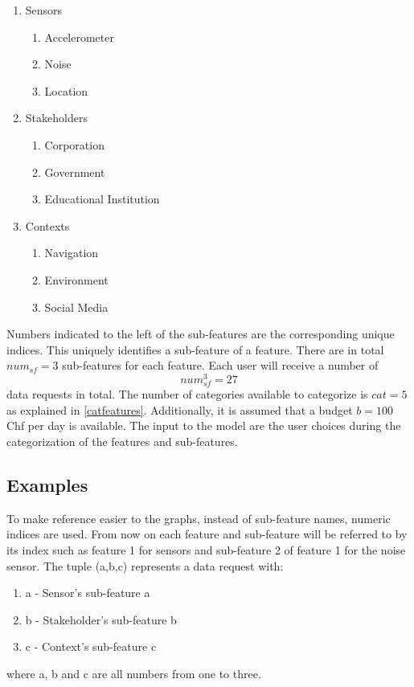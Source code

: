 \begin{enumerate}
    \item Sensors
    \begin{enumerate}
    \item Accelerometer 
    \item Noise 
    \item Location 
   \end{enumerate}
    \item Stakeholders 
    \begin{enumerate}
    \item Corporation 
    \item Government 
    \item Educational Institution 
   \end{enumerate}
   \item Contexts
    \begin{enumerate}
    \item Navigation 
    \item Environment 
    \item Social Media 
   \end{enumerate}
 \end{enumerate}
 
Numbers indicated to the left of the sub-features are the corresponding unique indices. This uniquely identifies a sub-feature of a feature. There are in total $num_{sf}=3$ sub-features for each feature.
Each user will receive a number of $$num_{sf}^3=27$$ data requests in total. The number of categories available to categorize is $cat=5$ as explained in \ref{catfeatures}. Additionally, it is assumed that a budget $b=100$ Chf per day is available. 
The input to the model are the user choices during the categorization of the features and sub-features.

\subsection{Examples}

To make reference easier to the graphs, instead of sub-feature names, numeric indices are used. From now on each feature and sub-feature will be referred to by its index such as feature 1 for sensors and sub-feature 2 of feature 1 for the noise sensor. The tuple (a,b,c) represents a data request with:
\begin{enumerate}
    \item a - Sensor's sub-feature a
    \item b - Stakeholder's sub-feature b
    \item c - Context's sub-feature c
   \end{enumerate}
where a, b and c are all numbers from one to three. 


